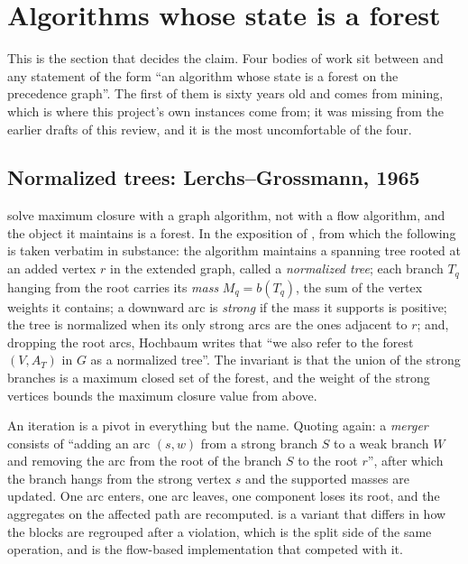 \section{Algorithms whose state is a forest}\label{sec:forests}

This is the section that decides the claim. Four bodies of work sit between
\FSC{} and any statement of the form ``an algorithm whose state is a forest on
the precedence graph''. The first of them is sixty years old and comes from
mining, which is where this project's own instances come from; it was missing
from the earlier drafts of this review, and it is the most uncomfortable of the
four.

\subsection{Normalized trees: Lerchs--Grossmann, 1965}\label{sec:lg}

\citet{LerchsGrossmann1965} solve maximum closure with a graph algorithm, not
with a flow algorithm, and the object it maintains is a forest. In the exposition
of \citet{Hochbaum2001}, from which the following is taken verbatim in substance:
the algorithm maintains a spanning tree rooted at an added vertex $r$ in the
extended graph, called a \emph{normalized tree}; each branch $T_q$ hanging from
the root carries its \emph{mass} $M_q = b(T_q)$, the sum of the vertex weights it
contains; a downward arc is \emph{strong} if the mass it supports is positive;
the tree is normalized when its only strong arcs are the ones adjacent to $r$;
and, dropping the root arcs, Hochbaum writes that ``we also refer to the forest
$(V, A_T)$ in $G$ as a normalized tree''. The invariant is that the union of the
strong branches is a maximum closed set of the forest, and the weight of the
strong vertices bounds the maximum closure value from above.

An iteration is a pivot in everything but the name. Quoting \citet{Hochbaum2001}
again: a \emph{merger} consists of ``adding an arc $(s,w)$ from a strong branch
$S$ to a weak branch $W$ and removing the arc from the root of the branch $S$ to
the root $r$'', after which the branch hangs from the strong vertex $s$ and the
supported masses are updated. One arc enters, one arc leaves, one component
loses its root, and the aggregates on the affected path are recomputed.
\citet{ZhaoKim1992} is a variant that differs in how the blocks are regrouped
after a violation, which is the split side of the same operation, and
\citet{GianniniEtAl1991} is the flow-based implementation that competed with it.

